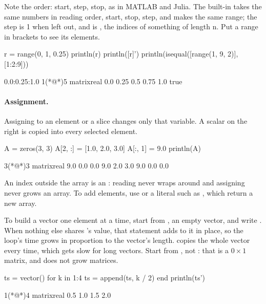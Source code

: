 \documentclass[11pt,a4paper,openany]{report}
\begin{document}
{{Note the order: start, step, stop, as in MATLAB and Julia. The built-in
 takes the same numbers in reading order, start, stop, step, and
makes the same range; the step is 1 when left out, and  is
, the indices of something of length n. Put a range in brackets to
see its elements.

\begin{axon}
r = range(0, 1, 0.25)
println(r)
println([r]')
println(isequal([range(1, 9, 2)], [1:2:9]))
\end{axon}
\begin{axonout}
0.0:0.25:1.0
1(*@\texttimes@*)5 matrix{real}
  0.0  0.25  0.5  0.75  1.0
true
\end{axonout}

\paragraph{Assignment.} Assigning to an element or a slice changes only that
variable. A scalar on the right is copied into every selected element.

\begin{axon}
A = zeros(3, 3)
A[2, :] = [1.0, 2.0, 3.0]
A[:, 1] = 9.0
println(A)
\end{axon}
\begin{axonout}
3(*@\texttimes@*)3 matrix{real}
  9.0  0.0  0.0
  9.0  2.0  3.0
  9.0  0.0  0.0
\end{axonout}

An index outside the array is an : reading never wraps around
and assigning never grows an array. To add elements, use  or
a literal such as \code{[v; x]}, which return a new array.

To build a vector one element at a time, start from ,
an empty vector, and write . When nothing else shares
's value, that statement adds to it in place, so the loop's time grows
in proportion to the vector's length.  copies the whole
vector every time, which gets slow for long vectors. Start from
, not : that is a $0 \times 1$ matrix, and
 does not grow matrices.

\begin{axon}
ts = vector()
for k in 1:4
  ts = append(ts, k / 2)
end
println(ts')
\end{axon}
\begin{axonout}
1(*@\texttimes@*)4 matrix{real}
  0.5  1.0  1.5  2.0
\end{axonout}

}}
\end{document}

